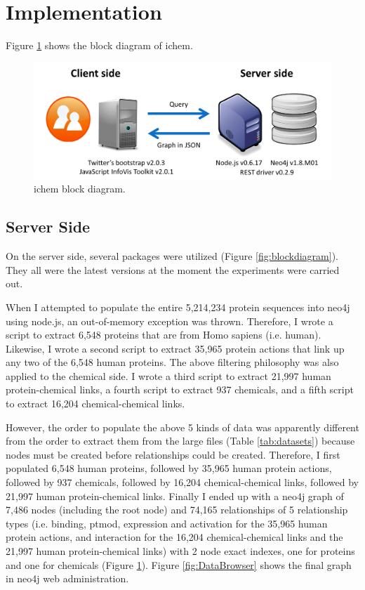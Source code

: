 \documentclass[10pt,conference,compsocconf]{../IEEEtran}
\begin{document}
\section{Implementation}

Figure \ref{fig:BlockDiagram} shows the block diagram of ichem.

\begin{figure}
\centering
\includegraphics[width=\linewidth]{BlockDiagram.png}
\caption{ichem block diagram.}
\label{fig:BlockDiagram}
\end{figure}

\subsection{Server Side}

On the server side, several packages were utilized (Figure \ref{fig:blockdiagram}). They all were the latest versions at the moment the experiments were carried out.

When I attempted to populate the entire 5,214,234 protein sequences into neo4j using node.js, an out-of-memory exception was thrown. Therefore, I wrote a script to extract 6,548 proteins that are from Homo sapiens (i.e. human). Likewise, I wrote a second script to extract 35,965 protein actions that link up any two of the 6,548 human proteins. The above filtering philosophy was also applied to the chemical side. I wrote a third script to extract 21,997 human protein-chemical links, a fourth script to extract 937 chemicals, and a fifth script to extract 16,204 chemical-chemical links.

However, the order to populate the above 5 kinds of data was apparently different from the order to extract them from the large files (Table \ref{tab:datasets}) because nodes must be created before relationships could be created. Therefore, I first populated 6,548 human proteins, followed by 35,965 human protein actions, followed by 937 chemicals, followed by 16,204 chemical-chemical links, followed by 21,997 human protein-chemical links. Finally I ended up with a neo4j graph of 7,486 nodes (including the root node) and 74,165 relationships of 5 relationship types (i.e. binding, ptmod, expression and activation for the 35,965 human protein actions, and interaction for the 16,204 chemical-chemical links and the 21,997 human protein-chemical links) with 2 node exact indexes, one for proteins and one for chemicals (Figure \ref{fig:BlockDiagram}). Figure \ref{fig:DataBrowser} shows the final graph in neo4j web administration.
\end{document}
